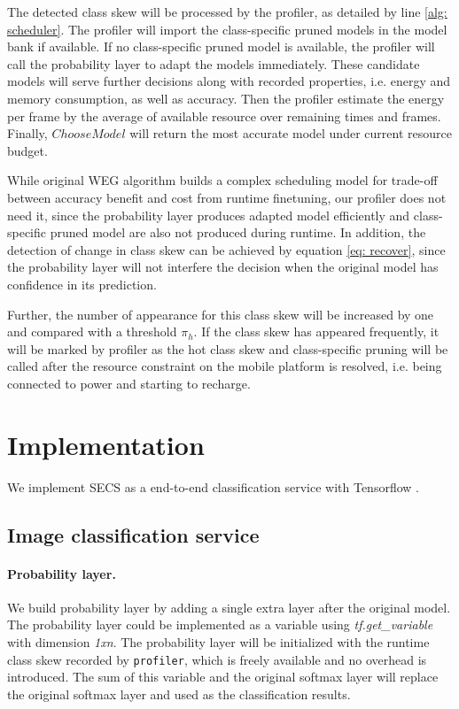 \documentclass[pageno]{jpaper}
\begin{document}
The detected class skew will be processed by the profiler, as detailed by line \ref{alg: scheduler}. The profiler will import the class-specific pruned models in the model bank if available. If no class-specific pruned model is available, the profiler will call the probability layer to adapt the models immediately. These candidate models will serve further decisions along with recorded properties, i.e. energy and memory consumption, as well as accuracy. Then the profiler estimate the energy per frame by the average of available resource over remaining times and frames. Finally, $ChooseModel$ will return the most accurate model under current resource budget. 

While original WEG algorithm \cite{shen2016fast} builds a complex scheduling model for trade-off between accuracy benefit and cost from runtime finetuning, our profiler does not need it, since the probability layer produces adapted model efficiently and class-specific pruned model are also not produced during runtime. In addition, the detection of change in class skew can be achieved by equation \ref{eq: recover}, since the probability layer will not interfere the decision when the original model has confidence in its prediction.




Further, the number of appearance for this class skew will be increased by one and compared with a threshold $\pi_h$. If the class skew has appeared frequently, it will be marked by profiler as the hot class skew and class-specific pruning will be called after the resource constraint on the mobile platform is resolved, i.e. being connected to power and starting to recharge.





\section{Implementation} \label{implementation}
We implement SECS as a end-to-end classification service with Tensorflow \cite{tensorflow2015-whitepaper}. 


\subsection{Image classification service}
\paragraph{Probability layer.}
We build probability layer by adding a single extra layer after the original model. The probability layer could be implemented as a variable using \textit{tf.get\_variable} with dimension \textit{1xn}. The probability layer will be initialized with the runtime class skew recorded by \texttt{profiler}, which is freely available and no overhead is introduced. The sum of this variable and the original softmax layer will replace the original softmax layer and used as the classification results. 
\end{document}
